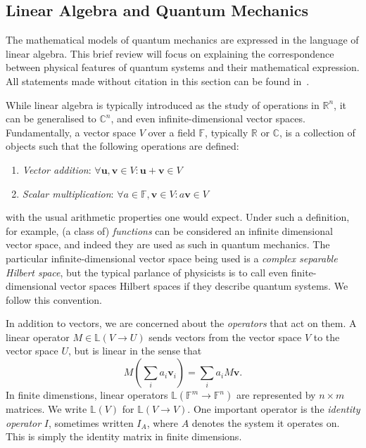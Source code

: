 \documentclass[10pt, a4paper]{article}
\numberwithin{equation}{section} %
\theoremstyle{definition}
\theoremstyle{plain}
\newcommand{\?}{\mathrel{?}} %
\newcommand{\R}{\mathbb{R}} %
\newcommand{\C}{\mathbb{C}} %
\newcommand{\Lin}[1]{\mathbb{L}\left(#1\right)}
\newcommand{\cvec}[1]{\boldsymbol{\mathbf{#1}}}    %
\begin{document}
\begin{appendices}
                          \subsection{Linear Algebra and Quantum Mechanics}\label{sec:prelim_linalg}

                          The mathematical models of quantum mechanics are expressed in the language of linear algebra. This brief review will focus on explaining the correspondence between physical features of quantum systems and their mathematical expression. All statements made without citation in this section can be found in~\cite{NielsenChuang}.

                          While linear algebra is typically introduced as the study of operations in \(\R^n\), it can be generalised to \(\C^n\), and even infinite-dimensional vector spaces. Fundamentally, a vector space \(V\) over a field \(\mathbb{F}\), typically \(\R\) or \(\C\), is a collection of objects such that the following operations are defined:
                          \begin{enumerate}
                            \item \emph{Vector addition}: \(\forall \cvec{u}, \cvec{v} \in V : \cvec{u} + \cvec{v} \in V\)
                            \item \emph{Scalar multiplication}: \(\forall a \in \mathbb{F}, \cvec{v} \in V : a\cvec{v} \in V\)
                          \end{enumerate}
                          with the usual arithmetic properties one would expect. Under such a definition, for example, (a class of) \emph{functions} can be considered an infinite dimensional vector space, and indeed they are used as such in quantum mechanics. The particular infinite-dimensional vector space being used is a \emph{complex separable Hilbert space}, but the typical parlance of physicists is to call even finite-dimensional vector spaces Hilbert spaces if they describe quantum systems. We follow this convention.

                          In addition to vectors, we are concerned about the \emph{operators} that act on them. A linear operator \(M \in \Lin{V \to U}\) sends vectors from the vector space \(V\) to the vector space \(U\), but is linear in the sense that
                          \begin{equation}
                            M\left(\sum_i a_i\cvec{v}_i\right) = \sum_i a_i M\cvec{v}.
                          \end{equation}
                          In finite dimenstions, linear operators \(\Lin{\mathbb{F}^m \to \mathbb{F}^n}\) are represented by \(n \times m\) matrices. We write \(\Lin{V}\) for \(\Lin{V \to V}\). One important operator is the \emph{identity operator} \(I\), sometimes written \(I_A\), where \(A\) denotes the system it operates on. This is simply the identity matrix in finite dimensions.


\end{appendices}
\end{document}
